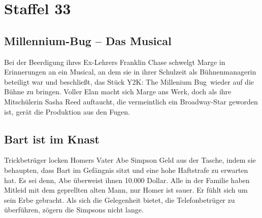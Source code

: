 \section{Staffel 33}

\subsection{Millennium-Bug -- Das Musical}
Bei der Beerdigung ihres Ex-Lehrers Franklin Chase schwelgt Marge in Erinnerungen an ein Musical, an dem sie in ihrer Schulzeit als Bühnenmanagerin beteiligt war und beschließt, das Stück \grqq Y2K: The Millenium Bug\grqq\ wieder auf die Bühne zu bringen. Voller Elan macht sich Marge ans Werk, doch als ihre Mitschülerin Sasha Reed auftaucht, die vermeintlich ein Broadway-Star geworden ist, gerät die Produktion aus den Fugen.


\subsection{Bart ist im Knast}
Trickbetrüger locken Homers Vater Abe Simpson Geld aus der Tasche, indem sie behaupten, dass Bart im Gefängnis sitzt und eine hohe Haftstrafe zu erwarten hat. Es sei denn, Abe überweist ihnen 10.000 Dollar. Alle in der Familie haben Mitleid mit dem geprellten alten Mann, nur Homer ist sauer. Er fühlt sich um sein Erbe gebracht. Als sich die Gelegenheit bietet, die Telefonbetrüger zu überführen, zögern die Simpsons nicht lange.


